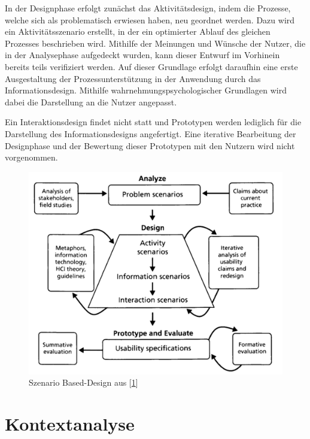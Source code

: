 \documentclass[
  12pt,
  ngerman,
  a4paper,
]{article}
\begin{document}
In der Designphase erfolgt zunächst das Aktivitätsdesign, indem die
Prozesse, welche sich als problematisch erwiesen haben, neu geordnet
werden. Dazu wird ein Aktivitätsszenario erstellt, in der ein
optimierter Ablauf des gleichen Prozesses beschrieben wird. Mithilfe der
Meinungen und Wünsche der Nutzer, die in der Analysephase aufgedeckt
wurden, kann dieser Entwurf im Vorhinein bereits teils verifiziert
werden. Auf dieser Grundlage erfolgt daraufhin eine erste Ausgestaltung
der Prozessunterstützung in der Anwendung durch das Informationsdesign.
Mithilfe wahrnehmungspsychologischer Grundlagen wird dabei die
Darstellung an die Nutzer angepasst.

Ein Interaktionsdesign findet nicht statt und Prototypen werden
lediglich für die Darstellung des Informationsdesigns angefertigt. Eine
iterative Bearbeitung der Designphase und der Bewertung dieser
Prototypen mit den Nutzern wird nicht vorgenommen.

\begin{figure}
\hypertarget{fig:sbd}{%
\centering
\includegraphics{./tex2pdf.-c803d322dfea80aa/e706dd62fa4a06e8ad5c31ed0d657fd3a87224be.png}
\caption{Szenario Based-Design aus
{[}\protect\hyperlink{ref-sbd}{1}{]}}\label{fig:sbd}
}
\end{figure}

\hypertarget{sec:context}{%
\section{Kontextanalyse}\label{sec:context}}
\end{document}
